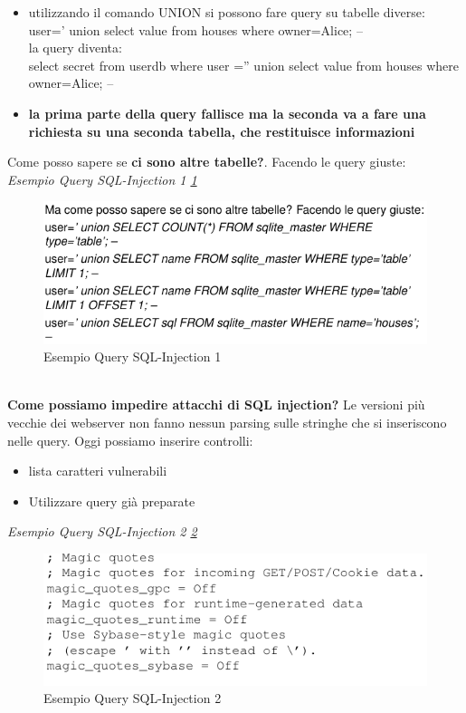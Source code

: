\documentclass[12pt]{article}
\begin{document}
				\begin{itemize}
					\item utilizzando il comando UNION si possono fare query su tabelle diverse:\\
					user=’ union select value from houses where owner=Alice; – \\
					la query diventa:\\
					select secret from userdb where user =” union select value from houses
					where owner=Alice; –
					\item \textbf{la prima parte della query fallisce ma la seconda va a fare una richiesta su una seconda tabella, che restituisce informazioni}
				\end{itemize}
				
				Come posso sapere se \textbf{ci sono altre tabelle?}. Facendo le query giuste:\\
				
				\textit{Esempio Query SQL-Injection 1 \ref{fig:32}}\\
				\begin{figure}[h!]
					\centering
					\includegraphics[scale=0.60]{img/query.PNG}
					\caption{Esempio Query SQL-Injection 1 \label{fig:32}}
				\end{figure}\\
				
				\textbf{Come possiamo impedire attacchi di SQL injection?} Le versioni più vecchie dei webserver non fanno nessun parsing sulle stringhe che si inseriscono nelle query. Oggi possiamo inserire controlli:
				\begin{itemize}
					\item lista caratteri vulnerabili
					\item Utilizzare query già preparate
				\end{itemize}
						
				\textit{Esempio Query SQL-Injection 2 \ref{fig:33}}\\
				\begin{figure}[h!]
					\centering
					\includegraphics[scale=0.60]{img/vulnerable.PNG}
					\caption{Esempio Query SQL-Injection 2 \label{fig:33}}
				\end{figure}\\
			
\end{document}
